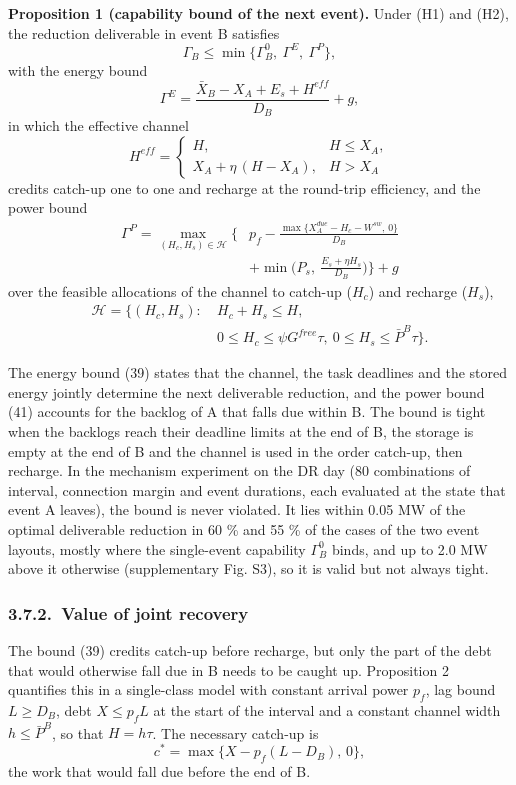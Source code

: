 \documentclass[a4paper,twocolumn,fleqn,10pt]{article}
\begin{document}
\textbf{Proposition 1 (capability bound of the next event).} Under (H1) and (H2), the reduction deliverable in event B satisfies \[\Gamma_B\le\min\big\{\Gamma^0_B,\ \Gamma^E,\ \Gamma^P\big\}, \tag{38}\] with the energy bound \[\Gamma^E=\frac{\bar X_B-X_A+E_s+H^{eff}}{D_B}+g, \tag{39}\] in which the effective channel \[H^{eff}=\begin{cases}H,&H\le X_A,\\X_A+\eta\,(H-X_A),&H>X_A\end{cases} \tag{40}\] credits catch-up one to one and recharge at the round-trip efficiency, and the power bound \[\begin{aligned}\Gamma^P=\max_{(H_c,H_s)\in\mathcal H}\Big\{&p_f-\frac{\max\{X^{due}_A-H_c-W^{sw},\,0\}}{D_B}\\&+\min\Big(P_s,\ \frac{E_s+\eta H_s}{D_B}\Big)\Big\}+g\end{aligned} \tag{41}\] over the feasible allocations of the channel to catch-up (\(H_c\)) and recharge (\(H_s\)), \[\begin{aligned}\mathcal H=\big\{(H_c,H_s):\ &H_c+H_s\le H,\\&0\le H_c\le\psi G^{free}\tau,\ 0\le H_s\le\bar P^{B}\tau\big\}.\end{aligned} \tag{42}\]

The energy bound (39) states that the channel, the task deadlines and the stored energy jointly determine the next deliverable reduction, and the power bound (41) accounts for the backlog of A that falls due within B. The bound is tight when the backlogs reach their deadline limits at the end of B, the storage is empty at the end of B and the channel is used in the order catch-up, then recharge. In the mechanism experiment on the DR day (80 combinations of interval, connection margin and event durations, each evaluated at the state that event A leaves), the bound is never violated. It lies within 0.05 MW of the optimal deliverable reduction in 60 \% and 55 \% of the cases of the two event layouts, mostly where the single-event capability \(\Gamma^0_B\) binds, and up to 2.0 MW above it otherwise (supplementary Fig. S3), so it is valid but not always tight.

\subsubsection*{3.7.2.~Value of joint recovery}

The bound (39) credits catch-up before recharge, but only the part of the debt that would otherwise fall due in B needs to be caught up. Proposition 2 quantifies this in a single-class model with constant arrival power \(p_f\), lag bound \(L\ge D_B\), debt \(X\le p_fL\) at the start of the interval and a constant channel width \(h\le\bar P^{B}\), so that \(H=h\tau\). The necessary catch-up is \[c^*=\max\{X-p_f(L-D_B),\,0\}, \tag{43}\] the work that would fall due before the end of B.
\end{document}
